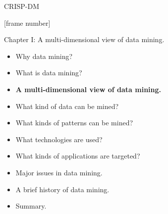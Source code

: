 \documentclass[aspectratio=169,t]{beamer}
\begin{document}
{\begin{frame}{CRISP-DM}
    \end{frame}
  }

  {
    [frame number]
    \begin{frame}{Chapter I: A multi-dimensional view of data mining.}
        \begin{itemize}
            \item Why data mining?
            \item What is data mining?
            \item \textbf{A multi-dimensional view of data mining.}
            \item What kind of data can be mined?
            \item What kinds of patterns can be mined?
            \item What technologies are used?
            \item What kinds of applications are targeted?
            \item Major issues in data mining.
            \item A brief history of data mining.
            \item Summary.
        \end{itemize}
    \end{frame}
  }
\end{document}
